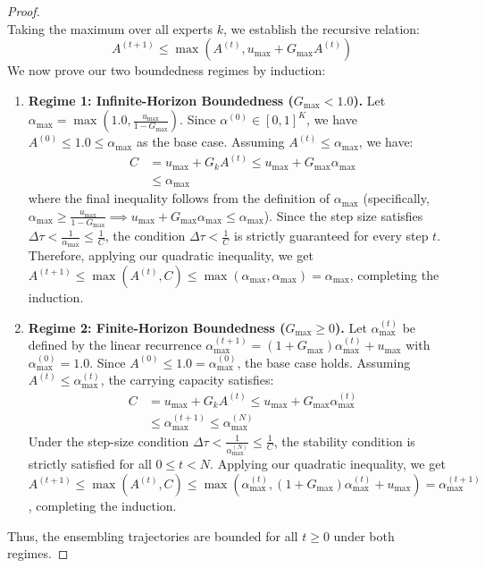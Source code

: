\begin{proof}
\begin{equation}
\end{equation}
Taking the maximum over all experts $k$, we establish the recursive relation:
\begin{equation}
    A^{(t+1)} \leq \max\left( A^{(t)}, u_{\max} + G_{\max} A^{(t)} \right)
\end{equation}
We now prove our two boundedness regimes by induction:
\begin{enumerate}
    \item \textbf{Regime 1: Infinite-Horizon Boundedness ($G_{\max} < 1.0$).} Let $\alpha_{\max} = \max\left(1.0, \frac{u_{\max}}{1 - G_{\max}}\right)$. Since $\alpha^{(0)} \in [0, 1]^K$, we have $A^{(0)} \leq 1.0 \leq \alpha_{\max}$ as the base case. Assuming $A^{(t)} \leq \alpha_{\max}$, we have:
    \begin{align}
        C &= u_{\max} + G_k A^{(t)} \leq u_{\max} + G_{\max} \alpha_{\max} \nonumber \\
        &\leq \alpha_{\max}
    \end{align}
    where the final inequality follows from the definition of $\alpha_{\max}$ (specifically, $\alpha_{\max} \geq \frac{u_{\max}}{1 - G_{\max}} \implies u_{\max} + G_{\max} \alpha_{\max} \leq \alpha_{\max}$). Since the step size satisfies $\Delta \tau < \frac{1}{\alpha_{\max}} \leq \frac{1}{C}$, the condition $\Delta \tau < \frac{1}{C}$ is strictly guaranteed for every step $t$. Therefore, applying our quadratic inequality, we get $A^{(t+1)} \leq \max\left( A^{(t)}, C \right) \leq \max\left( \alpha_{\max}, \alpha_{\max} \right) = \alpha_{\max}$, completing the induction.
    \item \textbf{Regime 2: Finite-Horizon Boundedness ($G_{\max} \geq 0$).} Let $\alpha_{\max}^{(t)}$ be defined by the linear recurrence $\alpha_{\max}^{(t+1)} = (1 + G_{\max}) \alpha_{\max}^{(t)} + u_{\max}$ with $\alpha_{\max}^{(0)} = 1.0$. Since $A^{(0)} \leq 1.0 = \alpha_{\max}^{(0)}$, the base case holds. Assuming $A^{(t)} \leq \alpha_{\max}^{(t)}$, the carrying capacity satisfies:
    \begin{align}
        C &= u_{\max} + G_k A^{(t)} \leq u_{\max} + G_{\max} \alpha_{\max}^{(t)} \nonumber \\
        &\leq \alpha_{\max}^{(t+1)} \leq \alpha_{\max}^{(N)}
    \end{align}
    Under the step-size condition $\Delta \tau < \frac{1}{\alpha_{\max}^{(N)}} \leq \frac{1}{C}$, the stability condition is strictly satisfied for all $0 \leq t < N$. Applying our quadratic inequality, we get $A^{(t+1)} \leq \max\left( A^{(t)}, C \right) \leq \max\left( \alpha_{\max}^{(t)}, (1 + G_{\max}) \alpha_{\max}^{(t)} + u_{\max} \right) = \alpha_{\max}^{(t+1)}$, completing the induction.
\end{enumerate}
Thus, the ensembling trajectories are bounded for all $t \geq 0$ under both regimes.
\end{proof}

